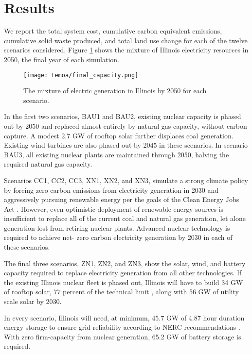 \section{Results}

We report the total system cost, cumulative carbon equivalent emissions,
cumulative solid waste produced, and total land use change for each of the
twelve scenarios considered. Figure \ref{fig:cap-2050} shows the mixture of
Illinois electricity resources in 2050, the final year of each simulation.

\begin{figure}[H]
  \centering
  \texttt{[image: temoa/final\_capacity.png]}
  \caption{The mixture of electric generation in Illinois by 2050 for each scenario.}
  \label{fig:cap-2050}
\end{figure}

In the first two scenarios, BAU1 and BAU2, existing nuclear capacity is phased out
by 2050 and replaced almost entirely by natural gas capacity, without carbon
capture. A modest 2.7 GW of rooftop solar further displaces coal generation.
Existing wind turbines are also phased out by 2045 in these scenarios. In
scenario BAU3, all existing nuclear plants are maintained through 2050, halving
the required natural gas capacity.

Scenarios CC1, CC2, CC3, XN1, XN2, and XN3, simulate a strong climate policy by
forcing zero carbon emissions from electricity generation in 2030 and
aggressively pursuing renewable energy per the goals of the Clean Energy Jobs
Act \cite{illinois_clean_jobs_coalition_clean_2021}. However, even optimistic
deployment of renewable energy sources is insufficient to replace all of the
current coal and natural gas generation, let alone generation lost from
retiring nuclear plants. Advanced nuclear technology is required to achieve net-
zero carbon electricity generation by 2030 in each of these scenarios.

The final three scenarios, ZN1, ZN2, and ZN3, show the solar, wind, and battery
capacity required to replace electricity generation from all other technologies.
If the existing Illinois nuclear fleet is phased out, Illinois will have to
build 34 GW of rooftop solar, 77 percent of the technical limit \cite{gagnon_rooftop_2016}, along with 56 GW of utility scale solar by 2030.

In every scenario, Illinois will need, at minimum, 45.7 GW of 4.87 hour duration
energy storage to ensure grid reliability according to NERC recommendations
\cite{milligan_methods_2011}. With zero firm-capacity from nuclear
generation, 65.2 GW of battery storage is required.

